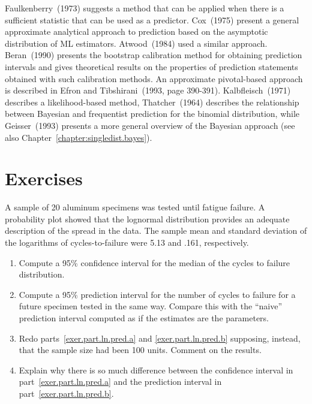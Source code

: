 Faulkenberry~(1973) suggests a method that can be applied when there
is a sufficient statistic that can be used as a predictor. Cox~(1975)
present a general approximate analytical approach to prediction based
on the asymptotic distribution of ML estimators.  Atwood~(1984) used a
similar approach. Beran~(1990) presents the bootstrap calibration method
for obtaining prediction intervals and gives theoretical results on the
properties of prediction statements obtained with such calibration methods.
An approximate pivotal-based approach is described
in Efron and Tibshirani~(1993, page 390-391).  Kalbfleisch~(1971)
describes a likelihood-based method, Thatcher~(1964) describes the
relationship between Bayesian and frequentist prediction for the binomial
distribution, while Geisser~(1993) presents a more general overview of the 
Bayesian approach (see also Chapter~\ref{chapter:singledist.bayes}).

\section*{Exercises}

\begin{exercise}
A sample of 20 aluminum specimens was tested until fatigue failure. A
probability plot showed that the lognormal distribution provides an
adequate description of the spread in the data.  The sample mean and
standard deviation of the logarithms of cycles-to-failure were 5.13 and
.161, respectively.
\begin{enumerate}
\item
\label{exer.part.ln.pred.a}
Compute a 95\% confidence interval for the median 
of the cycles to failure distribution.
\item
\label{exer.part.ln.pred.b}
Compute a 95\% prediction interval for the number of cycles to failure
for a future specimen tested in the same way. Compare this with the
``naive'' prediction interval computed as if the estimates are the
parameters.
\item
Redo parts~\ref{exer.part.ln.pred.a} and
\ref{exer.part.ln.pred.b}
supposing, instead, that the sample size had been 100 units.
Comment on the results.
\item
Explain why there is so much difference between 
the confidence interval in part~\ref{exer.part.ln.pred.a} and the
prediction interval in part~\ref{exer.part.ln.pred.b}.
\end{enumerate}
\end{exercise}

